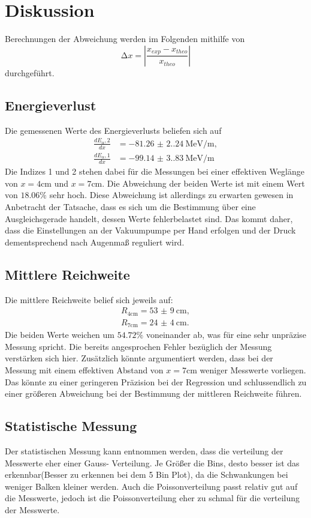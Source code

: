 \section{Diskussion}
\label{sec:Diskussion}

Berechnungen der Abweichung werden im Folgenden mithilfe von 
\begin{equation*}
    \increment x = \left| \frac{x_{exp}-x_{theo}}{x_{theo}} \right|
\end{equation*}
durchgeführt.

\subsection{Energieverlust}
Die gemessenen Werte des Energieverlusts beliefen sich auf 
\begin{align*}
    \frac{dE_\alpha,2}{dx} &= \qty{-81.26(2.24)}{\mega\electronvolt\per\meter}, \\
    \frac{dE_\alpha,1}{dx} &= \qty{-99.14(3.83)}{\mega\electronvolt\per\meter}
\end{align*}
Die Indizes 1 und 2 stehen dabei für die Messungen bei einer effektiven 
Weglänge von $x = 4 \unit{\centi\meter}$ und $x = 7 \unit{\centi\meter}$.
Die Abweichung der beiden Werte ist mit einem Wert von $18.06 \%$ sehr hoch.
Diese Abweichung ist allerdings zu erwarten gewesen in Anbetracht der Tatsache, 
dass es sich um die Bestimmung über eine Ausgleichsgerade handelt, dessen Werte 
fehlerbelastet sind. Das kommt daher, dass die Einstellungen an der Vakuumpumpe 
per Hand erfolgen und der Druck dementsprechend nach Augenmaß reguliert wird.

\subsection{Mittlere Reichweite}
Die mittlere Reichweite belief sich jeweils auf:
\begin{align}
    R_\text{4cm} = \qty{53(9)}{\centi\meter}, \\
    R_\text{7cm} = \qty{24(4)}{\centi\meter}.
\end{align}
Die beiden Werte weichen um $54.72 \%$ voneinander ab, was für eine sehr 
unpräzise Messung spricht. Die bereits angesprochen Fehler bezüglich der Messung 
verstärken sich hier. Zusätzlich könnte argumentiert werden, dass bei der 
Messung mit einem effektiven Abstand von $x = 7 \unit{\centi\meter}$ weniger
Messwerte vorliegen. Das könnte zu einer geringeren Präzision bei der Regression 
und schlussendlich zu einer größeren Abweichung bei der Bestimmung der mittleren 
Reichweite führen.

\subsection{Statistische Messung}
Der statistischen Messung kann entnommen werden, dass die verteilung der Messwerte eher einer Gauss-
Verteilung. Je Größer die Bins, desto besser ist das erkennbar(Besser zu erkennen bei dem 5 Bin Plot), da die Schwankungen bei weniger Balken kleiner werden.
Auch die Poissonverteilung passt relativ gut auf die Messwerte, jedoch ist die Poissonverteilung eher zu schmal 
für die verteilung der Messwerte. 